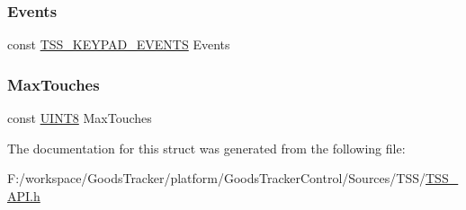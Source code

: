 \mbox{\label{struct_t_s_s___c_s_keypad_af3487ef3716a0cffa3cc5c5cbae6adc0}} 
\subsubsection{\texorpdfstring{Events}{Events}}
{\footnotesize\ttfamily const \hyperlink{struct_t_s_s___k_e_y_p_a_d___e_v_e_n_t_s}{T\+S\+S\+\_\+\+K\+E\+Y\+P\+A\+D\+\_\+\+E\+V\+E\+N\+TS} Events}

\mbox{\label{struct_t_s_s___c_s_keypad_a1cdf8334301941e54941c730f203aba8}} 
\subsubsection{\texorpdfstring{Max\+Touches}{MaxTouches}}
{\footnotesize\ttfamily const \hyperlink{_t_s_s___data_types_8h_ab27e9918b538ce9d8ca692479b375b6a}{U\+I\+N\+T8} Max\+Touches}



The documentation for this struct was generated from the following file\+:\begin{DoxyCompactItemize}
\item 
F\+:/workspace/\+Goods\+Tracker/platform/\+Goods\+Tracker\+Control/\+Sources/\+T\+S\+S/\hyperlink{_t_s_s___a_p_i_8h}{T\+S\+S\+\_\+\+A\+P\+I.\+h}\end{DoxyCompactItemize}
